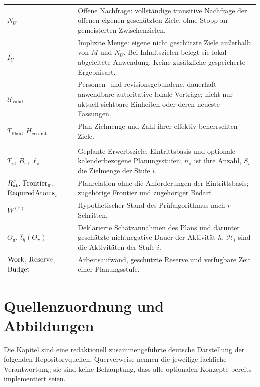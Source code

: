 \begin{longtable}{@{}P{42mm}P{106mm}@{}}
$N_U$ & Offene Nachfrage: vollständige transitive Nachfrage der offenen
eigenen geschützten Ziele, ohne Stopp an gemeisterten Zwischenzielen.\\
$I_U$ & Implizite Menge: eigene nicht geschützte Ziele außerhalb von $M$
und $N_U$. Bei Inhaltszielen belegt sie lokal abgeleitete Anwendung.
Keine zusätzliche gespeicherte Ergebnisart.\\
$\mathcal U_{\mathrm{valid}}$ & Personen- und revisionsgebundene, dauerhaft
anwendbare autoritative lokale Verträge; nicht nur aktuell sichtbare
Einheiten oder deren neueste Fassungen.\\
$T_{\mathrm{Plan}}$, $H_{\mathrm{gesamt}}$ & Plan-Zielmenge und Zahl ihrer
effektiv beherrschten Ziele.\\
\addlinespace
{}\\
$T_\pi$, $B_\pi$, $\ell_\pi$ & Geplante Erwerbsziele, Eintrittsbasis und
optionale kalenderbezogene Planungsstufen; $n_\pi$ ist ihre Anzahl,
$S_i$ die Zielmenge der Stufe $i$.\\
$R_{\mathrm{at}}^{\pi}$, $\operatorname{Frontier}_\pi$, $\operatorname{RequiredAtoms}_\pi$ & Planrelation ohne die
Anforderungen der Eintrittsbasis; zugehörige Frontier und zugehöriger
Bedarf.\\
$W^{(r)}$ & Hypothetischer Stand des Prüfalgorithmus nach $r$ Schritten.\\
$\Theta_\pi$, $\widehat t_h(\Theta_\pi)$ & Deklarierte Schätzannahmen des Plans
und darunter geschätzte nichtnegative Dauer der Aktivität $h$;
$\mathcal H_i$ sind die Aktivitäten der Stufe $i$.\\
$\operatorname{Work}$, $\operatorname{Reserve}$, $\operatorname{Budget}$ & Arbeitsaufwand, geschützte Reserve und
verfügbare Zeit einer Planungsstufe.\\
\bottomrule
\end{longtable}
\endgroup

\section{Quellenzuordnung und Abbildungen}
\label{sec:sources}
Die Kapitel sind eine redaktionell zusammengeführte deutsche Darstellung
der folgenden Repositoryquellen. Querverweise nennen die jeweilige
fachliche Verantwortung; sie sind keine Behauptung, dass alle optionalen
Konzepte bereits implementiert seien.

